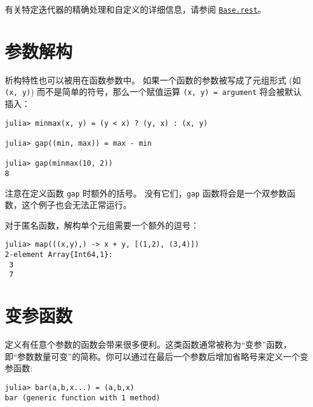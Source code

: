 有关特定迭代器的精确处理和自定义的详细信息，请参阅 \hyperlink{16112033990685296573}{\texttt{Base.rest}}。



\hypertarget{13913778167558632631}{}


\section{参数解构}



析构特性也可以被用在函数参数中。 如果一个函数的参数被写成了元组形式 (如  \texttt{(x, y)}) 而不是简单的符号，那么一个赋值运算 \texttt{(x, y) = argument} 将会被默认插入：




\begin{verbatim}
julia> minmax(x, y) = (y < x) ? (y, x) : (x, y)

julia> gap((min, max)) = max - min

julia> gap(minmax(10, 2))
8
\end{verbatim}



注意在定义函数 \texttt{gap} 时额外的括号。 没有它们，\texttt{gap} 函数将会是一个双参数函数，这个例子也会无法正常运行。



对于匿名函数，解构单个元组需要一个额外的逗号：




\begin{lstlisting}
julia> map(((x,y),) -> x + y, [(1,2), (3,4)])
2-element Array{Int64,1}:
 3
 7
\end{lstlisting}



\hypertarget{2609189760420802889}{}


\section{变参函数}



定义有任意个参数的函数会带来很多便利。这类函数通常被称为“变参”函数，即“参数数量可变”的简称。你可以通过在最后一个参数后增加省略号来定义一个变参函数:




\begin{verbatim}
julia> bar(a,b,x...) = (a,b,x)
bar (generic function with 1 method)
\end{verbatim}




